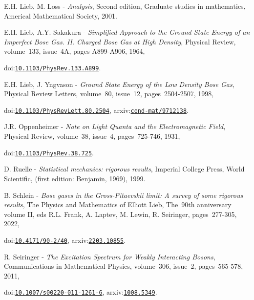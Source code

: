 E.H. Lieb, M. Loss - {\it Analysis}, Second edition, Graduate studies in mathematics, Americal Mathematical Society, 2001.\par\medskip
 
E.H. Lieb, A.Y. Sakakura - {\it Simplified Approach to the Ground-State Energy of an Imperfect Bose Gas. II. Charged Bose Gas at High Density}, Physical Review, volume\-~133, issue\-~4A, pages A899-A906, 1964,\par{}
doi:{\tt\color{blue}\href{http://dx.doi.org/10.1103/PhysRev.133.A899}{10.1103/PhysRev.133.A899}}.\par\medskip
 
E.H. Lieb, J. Yngvason - {\it Ground State Energy of the Low Density Bose Gas}, Physical Review Letters, volume\-~80, issue\-~12, pages\-~2504-2507, 1998,\par{}
doi:{\tt\color{blue}\href{http://dx.doi.org/10.1103/PhysRevLett.80.2504}{10.1103/PhysRevLett.80.2504}}, arxiv:{\tt\color{blue}\href{http://arxiv.org/abs/cond-mat/9712138}{cond-mat/9712138}}.\par\medskip
 
J.R. Oppenheimer - {\it Note on Light Quanta and the Electromagnetic Field}, Physical Review, volume\-~38, issue\-~4, pages\-~725-746, 1931,\par{}
doi:{\tt\color{blue}\href{http://dx.doi.org/10.1103/PhysRev.38.725}{10.1103/PhysRev.38.725}}.\par\medskip
 
D. Ruelle - {\it Statistical mechanics: rigorous results}, Imperial College Press, World Scientific, (first edition: Benjamin, 1969), 1999.\par\medskip
 
B. Schlein - {\it Bose gases in the Gross-Pitaevskii limit: A survey of some rigorous results}, The Physics and Mathematics of Elliott Lieb, The\-~90th anniversary volume II, eds R.L. Frank, A. Laptev, M. Lewin, R. Seiringer, pages\-~277-305, 2022,\par{}
doi:{\tt\color{blue}\href{http://dx.doi.org/10.4171/90-2/40}{10.4171/90-2/40}}, arxiv:{\tt\color{blue}\href{http://arxiv.org/abs/2203.10855}{2203.10855}}.\par\medskip
 
R. Seiringer - {\it The Excitation Spectrum for Weakly Interacting Bosons}, Communications in Mathematical Physics, volume\-~306, issue\-~2, pages\-~565-578, 2011,\par{}
doi:{\tt\color{blue}\href{http://dx.doi.org/10.1007/s00220-011-1261-6}{10.1007/s00220-011-1261-6}}, arxiv:{\tt\color{blue}\href{http://arxiv.org/abs/1008.5349}{1008.5349}}.\par\medskip
 
